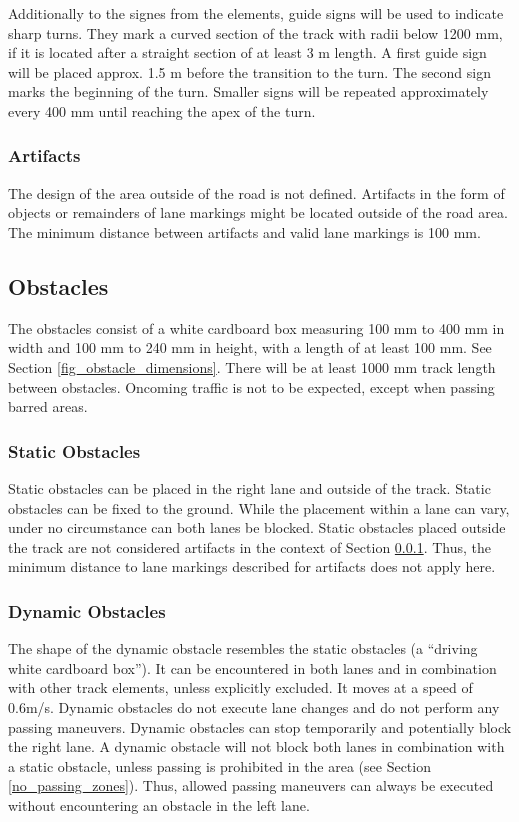 Additionally to the signes from the elements, guide signs will be used to indicate sharp turns.
They mark a curved section of the track with radii below 1200 mm, if it is located after a straight section of at least 3 m length.
A first guide sign will be placed approx. 1.5 m before the transition to the turn.
The second sign marks the beginning of the turn.
Smaller signs will be repeated approximately every 400 mm until reaching the apex of the turn.

\subsubsection{Artifacts}
\label{artifacts}

The design of the area outside of the road is not defined.
Artifacts in the form of objects or remainders of lane markings might be located outside of the road area.
The minimum distance between artifacts and valid lane markings is 100 mm.

\subsection{Obstacles}

The obstacles consist of a white cardboard box measuring 100 mm to 400 mm in width and 100 mm to 240 mm in height, with a length of at least 100 mm. 
See Section \ref{fig_obstacle_dimensions}.
There will be at least 1000 mm track length between obstacles.
Oncoming traffic is not to be expected, except when passing barred areas.

\subsubsection{Static Obstacles}

Static obstacles can be placed in the right lane and outside of the track.
Static obstacles can be fixed to the ground.
While the placement within a lane can vary, under no circumstance can both lanes be blocked.
Static obstacles placed outside the track are not considered artifacts in the context of Section \ref{artifacts}.
Thus, the minimum distance to lane markings described for artifacts does not apply here.

\subsubsection{Dynamic Obstacles}


The shape of the dynamic obstacle resembles the static obstacles (a “driving white cardboard box”).
It can be encountered in both lanes and in combination with other track elements, unless explicitly excluded.
It moves at a speed of 0.6m/s.
Dynamic obstacles do not execute lane changes and do not perform any passing maneuvers. 
Dynamic obstacles can stop temporarily and potentially block the right lane. 
A dynamic obstacle will not block both lanes in combination with a static obstacle, unless passing is prohibited in the area (see Section \ref{no_passing_zones}). 
Thus, allowed passing maneuvers can always be executed without encountering an obstacle in the left lane. 

